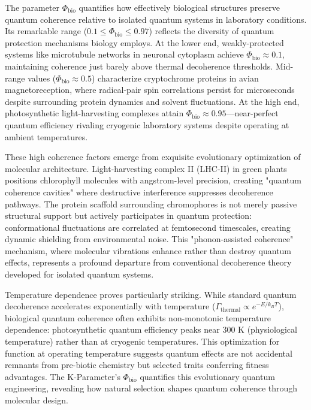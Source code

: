 \documentclass[11pt,a4paper,twoside]{article}
\begin{document}
The parameter $\Phi_{\text{bio}}$ quantifies how effectively biological structures preserve quantum coherence relative to isolated quantum systems in laboratory conditions. Its remarkable range ($0.1 \leq \Phi_{\text{bio}} \leq 0.97$) reflects the diversity of quantum protection mechanisms biology employs. At the lower end, weakly-protected systems like microtubule networks in neuronal cytoplasm achieve $\Phi_{\text{bio}} \approx 0.1$, maintaining coherence just barely above thermal decoherence thresholds. Mid-range values ($\Phi_{\text{bio}} \approx 0.5$) characterize cryptochrome proteins in avian magnetoreception, where radical-pair spin correlations persist for microseconds despite surrounding protein dynamics and solvent fluctuations. At the high end, photosynthetic light-harvesting complexes attain $\Phi_{\text{bio}} \approx 0.95$---near-perfect quantum efficiency rivaling cryogenic laboratory systems despite operating at ambient temperatures.

These high coherence factors emerge from exquisite evolutionary optimization of molecular architecture. Light-harvesting complex II (LHC-II) in green plants positions chlorophyll molecules with angstrom-level precision, creating "quantum coherence cavities" where destructive interference suppresses decoherence pathways. The protein scaffold surrounding chromophores is not merely passive structural support but actively participates in quantum protection: conformational fluctuations are correlated at femtosecond timescales, creating dynamic shielding from environmental noise. This "phonon-assisted coherence" mechanism, where molecular vibrations enhance rather than destroy quantum effects, represents a profound departure from conventional decoherence theory developed for isolated quantum systems.

Temperature dependence proves particularly striking. While standard quantum decoherence accelerates exponentially with temperature ($\Gamma_{\text{thermal}} \propto e^{-E/k_BT}$), biological quantum coherence often exhibits non-monotonic temperature dependence: photosynthetic quantum efficiency peaks near 300 K (physiological temperature) rather than at cryogenic temperatures. This optimization for function at operating temperature suggests quantum effects are not accidental remnants from pre-biotic chemistry but selected traits conferring fitness advantages. The K-Parameter's $\Phi_{\text{bio}}$ quantifies this evolutionary quantum engineering, revealing how natural selection shapes quantum coherence through molecular design.
\end{document}
